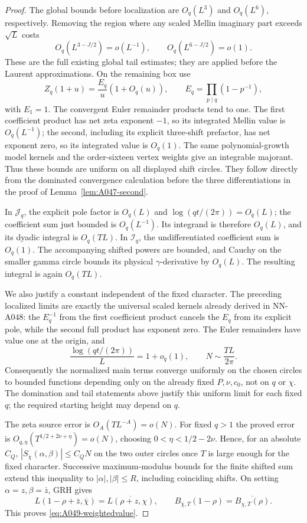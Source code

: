 \begin{proof}
The global bounds before localization are \(O_q(L^3)\)
and \(O_q(L^6)\), respectively. Removing the region where
any scaled Mellin imaginary part exceeds \(\sqrt L\)
costs
\[
                 O_q(L^{3-J/2})=o(L^{-1}),\qquad
                 O_q(L^{6-J/2})=o(1).
\]
These are the full existing global tail estimates; they
are applied before the Laurent approximations.
On the remaining box use
\[
                Z_q(1+u)=\frac{E_q}{u}(1+O_q(u)),
                 \qquad E_q=\prod_{p\mid q}(1-p^{-1}),
\]
with \(E_1=1\). The convergent Euler remainder products
tend to one. The first coefficient product has net
zeta exponent \(-1\), so its integrated Mellin value is
\(O_q(L^{-1})\); the second, including its explicit
three-shift prefactor, has net exponent zero, so its
integrated value is \(O_q(1)\).
The same polynomial-growth model kernels and the
order-sixteen vertex weights give an integrable majorant.
Thus these bounds are uniform on all displayed shift
circles. They follow directly from the dominated
convergence calculation before the three differentiations
in the proof of Lemma~\ref{lem:A047-second}.

In \(\mathcal J_q\), the explicit pole factor is \(O_q(L)\)
and \(\log(qt/(2\pi))=O_q(L)\); the coefficient sum just
bounded is \(O_q(L^{-1})\). Its integrand is therefore
\(O_q(L)\), and its dyadic integral is \(O_q(TL)\).
In \(\mathcal I_q\), the undifferentiated coefficient
sum is \(O_q(1)\). The accompanying shifted powers are
bounded, and Cauchy on the smaller gamma circle bounds
its physical \(\gamma\)-derivative by \(O_q(L)\).
The resulting integral is again \(O_q(TL)\).

We also justify a constant independent of the fixed
character. The preceding localized limits are exactly
the universal scaled kernels already derived in NN-A048:
the \(E_q^{-1}\) from the first coefficient product
cancels the \(E_q\) from its explicit pole, while the
second full product has exponent zero. The Euler
remainders have value one at the origin, and
\[
        \frac{\log(qt/(2\pi))}{L}=1+o_q(1),\qquad
                      N\sim\frac{TL}{2\pi}.
\]
Consequently the normalized main terms converge uniformly
on the chosen circles to bounded functions depending only
on the already fixed \(P,\nu,c_0\), not on \(q\) or \(\chi\).
The domination and tail statements above justify this
uniform limit for each fixed \(q\); the required starting
height may depend on \(q\).

The zeta source error is \(O_A(TL^{-A})=o(N)\).
For fixed \(q>1\) the proved error is
\(O_{q,\eta}(T^{1/2+2\nu+\eta})=o(N)\), choosing
\(0<\eta<1/2-2\nu\). Hence, for an absolute \(C_Q\),
\(|S_\chi(\alpha,\beta)|\le C_QN\) on the two outer
circles once \(T\) is large enough for the fixed character.
Successive maximum-modulus bounds for the finite shifted
sum extend this inequality to \(|\alpha|,|\beta|\le R\),
including coinciding shifts. On setting
\(\alpha=z,\beta=\bar z\), GRH gives
\[
 L(1-\rho+\bar z,\bar\chi)=\overline{L(\rho+z,\chi)},
 \qquad
 B_{\bar\chi,T}(1-\rho)=\overline{B_{\chi,T}(\rho)}.
\]
This proves \eqref{eq:A049-weightedvalue}.


\end{proof}
